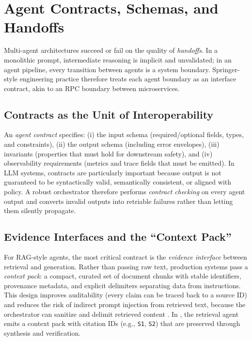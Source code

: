 \section{Agent Contracts, Schemas, and Handoffs}
\label{sec:agent-contracts}
Multi-agent architectures succeed or fail on the quality of \emph{handoffs}.
In a monolithic prompt, intermediate reasoning is implicit and unvalidated; in an agent pipeline, every transition between agents is a system boundary.
Springer-style engineering practice therefore treats each agent boundary as an interface contract, akin to an RPC boundary between microservices.

\subsection{Contracts as the Unit of Interoperability}
An \emph{agent contract} specifies:
(i) the input schema (required/optional fields, types, and constraints),
(ii) the output schema (including error envelopes),
(iii) invariants (properties that must hold for downstream safety),
and (iv) observability requirements (metrics and trace fields that must be emitted).
In LLM systems, contracts are particularly important because output is not guaranteed to be syntactically valid, semantically consistent, or aligned with policy.
A robust orchestrator therefore performs \emph{contract checking} on every agent output and converts invalid outputs into retriable failures rather than letting them silently propagate.

\subsection{Evidence Interfaces and the ``Context Pack''}
For RAG-style agents, the most critical contract is the \emph{evidence interface} between retrieval and generation.
Rather than passing raw text, production systems pass a \emph{context pack}: a compact, curated set of document chunks with stable identifiers, provenance metadata, and explicit delimiters separating data from instructions.
This design improves auditability (every claim can be traced back to a source ID) and reduces the risk of indirect prompt injection from retrieved text, because the orchestrator can sanitize and delimit retrieved content \cite{Greshake2023IndirectPromptInjection}.
In \ishtar{}, the retrieval agent emits a context pack with citation IDs (e.g., \texttt{S1}, \texttt{S2}) that are preserved through synthesis and verification.


